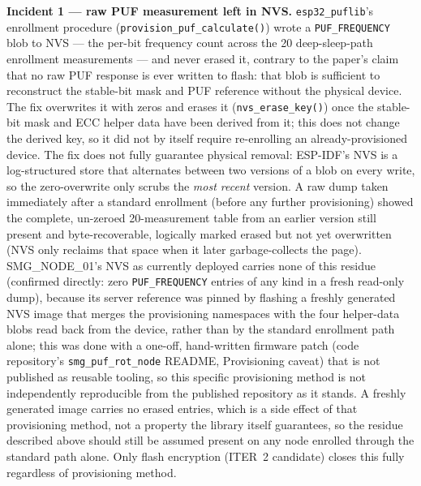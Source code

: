 \documentclass[12pt]{article}
\begin{document}
\textbf{Incident 1 --- raw PUF measurement left in NVS.} \texttt{esp32\_puflib}'s enrollment procedure (\texttt{provision\_puf\_calculate()}) wrote a \texttt{PUF\_FREQUENCY} blob to NVS --- the per-bit frequency count across the 20 deep-sleep-path enrollment measurements --- and never erased it, contrary to the paper's claim that no raw PUF response is ever written to flash: that blob is sufficient to reconstruct the stable-bit mask and PUF reference without the physical device. The fix overwrites it with zeros and erases it (\texttt{nvs\_erase\_key()}) once the stable-bit mask and ECC helper data have been derived from it; this does not change the derived key, so it did not by itself require re-enrolling an already-provisioned device. The fix does not fully guarantee physical removal: ESP-IDF's NVS is a log-structured store that alternates between two versions of a blob on every write, so the zero-overwrite only scrubs the \emph{most recent} version. A raw dump taken immediately after a standard enrollment (before any further provisioning) showed the complete, un-zeroed 20-measurement table from an earlier version still present and byte-recoverable, logically marked erased but not yet overwritten (NVS only reclaims that space when it later garbage-collects the page). SMG\_NODE\_01's NVS as currently deployed carries none of this residue (confirmed directly: zero \texttt{PUF\_FREQUENCY} entries of any kind in a fresh read-only dump), because its server reference was pinned by flashing a freshly generated NVS image that merges the provisioning namespaces with the four helper-data blobs read back from the device, rather than by the standard enrollment path alone; this was done with a one-off, hand-written firmware patch (code repository's \texttt{smg\_puf\_rot\_node} README, Provisioning caveat) that is not published as reusable tooling, so this specific provisioning method is not independently reproducible from the published repository as it stands. A freshly generated image carries no erased entries, which is a side effect of that provisioning method, not a property the library itself guarantees, so the residue described above should still be assumed present on any node enrolled through the standard path alone. Only flash encryption (ITER~2 candidate) closes this fully regardless of provisioning method.
\end{document}
